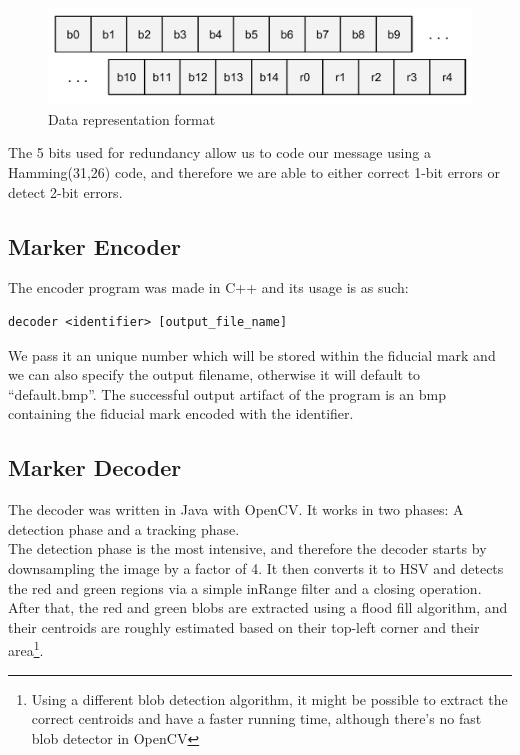 \documentclass[DIV=calc, paper=a4, fontsize=11pt, twocolumn]{scrartcl}   %
\begin{document}
\begin{figure}[!h]
    \centering
    \includegraphics[width=0.9\columnwidth]{bits.pdf}
    \caption{Data representation format}
    \label{fig:bits}
\end{figure}

The 5 bits used for redundancy allow us to code our message using a Hamming(31,26) code, and therefore we are able to either correct 1-bit errors or detect 2-bit errors.

\subsection*{Marker Encoder}

The encoder program was made in C++ and its usage is as such:
\begin{verbatim}
decoder <identifier> [output_file_name]
\end{verbatim}


We pass it an unique number which will be stored within the fiducial mark and we can also specify the output filename, otherwise it will default to ``default.bmp''. The successful output artifact of the program is an bmp containing the fiducial mark encoded with the identifier.

\subsection*{Marker Decoder}
The decoder was written in Java with OpenCV.
It works in two phases: A detection phase and a tracking phase.\\


The detection phase is the most intensive, and therefore the decoder starts by downsampling the image by a factor of 4. It then converts it to HSV and detects the red and green regions via a simple inRange filter and a closing operation.\\


After that, the red and green blobs are extracted using a flood fill algorithm, and their centroids are roughly estimated based on their top-left corner and their area\footnote{Using a different blob detection algorithm, it might be possible to extract the correct centroids and have a faster running time, although there's no fast blob detector in OpenCV}.
\end{document}
